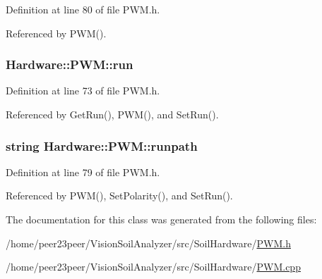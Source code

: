 Definition at line 80 of file P\+W\+M.\+h.



Referenced by P\+W\+M().

\hypertarget{class_hardware_1_1_p_w_m_a04531646b41accced24d46046c4bc7de}{}
\subsubsection[{run}]{ Hardware\+::\+P\+W\+M\+::run\hspace{0.3cm}{\ttfamily [private]}}\label{class_hardware_1_1_p_w_m_a04531646b41accced24d46046c4bc7de}


Definition at line 73 of file P\+W\+M.\+h.



Referenced by Get\+Run(), P\+W\+M(), and Set\+Run().

\hypertarget{class_hardware_1_1_p_w_m_ac1eb93467481ee2bd3565f1be47b8a01}{}
\subsubsection[{runpath}]{\setlength{\rightskip}{0pt plus 5cm}string Hardware\+::\+P\+W\+M\+::runpath\hspace{0.3cm}{\ttfamily [private]}}\label{class_hardware_1_1_p_w_m_ac1eb93467481ee2bd3565f1be47b8a01}


Definition at line 79 of file P\+W\+M.\+h.



Referenced by P\+W\+M(), Set\+Polarity(), and Set\+Run().



The documentation for this class was generated from the following files\+:\begin{DoxyCompactItemize}
\item 
/home/peer23peer/\+Vision\+Soil\+Analyzer/src/\+Soil\+Hardware/\hyperlink{_p_w_m_8h}{P\+W\+M.\+h}\item 
/home/peer23peer/\+Vision\+Soil\+Analyzer/src/\+Soil\+Hardware/\hyperlink{_p_w_m_8cpp}{P\+W\+M.\+cpp}\end{DoxyCompactItemize}
